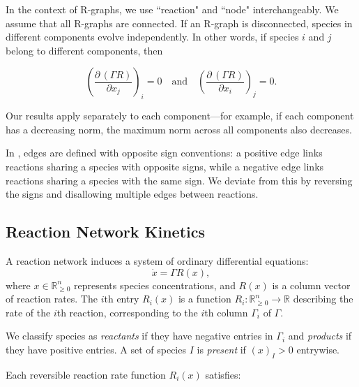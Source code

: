 \documentclass{article}
\begin{document}
 In the context of R-graphs, we use ``reaction" and ``node" interchangeably. We assume that all R-graphs are connected. If an R-graph is disconnected, species in different components evolve independently. In other words, if species \( i \) and \( j \) belong to different components, then


\[
\left( \frac{\partial\, (\Gamma R)}{\partial x_j} \right)_i = 0 \quad \text{and} \quad \left( \frac{\partial\, (\Gamma R)}{\partial x_i} \right)_j = 0.
\]


Our results apply separately to each component—for example, if each component has a decreasing norm, the maximum norm across all components also decreases.

 
 In \cite{Angeli2010-hj}, edges are defined with opposite sign conventions: a positive edge links reactions sharing a species with opposite signs, while a negative edge links reactions sharing a species with the same sign. We deviate from this by reversing the signs and disallowing multiple edges between reactions.


\subsection{Reaction Network Kinetics}

A reaction network induces a system of ordinary differential equations: 
\begin{equation}\label{eq_main}
    \dot{x} = \Gamma R(x),
\end{equation}
where \( x \in \mathbb{R}^n_{\geq 0} \) represents species concentrations, and \( R(x) \) is a column vector of reaction rates. The \( i \)th entry \( R_i(x) \) is a function \( R_i: \mathbb{R}^n_{\geq 0} \to \mathbb{R} \) describing the rate of the \( i \)th reaction, corresponding to the \( i \)th column \( \Gamma_i \) of \( \Gamma \). 

We classify species as \textit{reactants} if they have negative entries in \( \Gamma_i \) and \textit{products} if they have positive entries. A set of species \( I \) is \textit{present} if \( (x)_I > 0 \) entrywise.

Each reversible reaction rate function \( R_i(x) \) satisfies:
\end{document}
